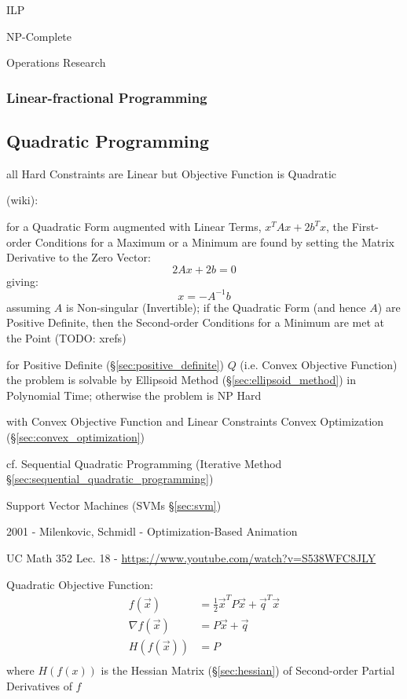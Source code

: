 ILP

NP-Complete

Operations Research



\subsubsection{Linear-fractional Programming}
\label{sec:linear_fractional_programming}



\subsection{Quadratic Programming}\label{sec:quadratic_programming}

all Hard Constraints are Linear but Objective Function is Quadratic

(wiki):

for a Quadratic Form augmented with Linear Terms, $x^TAx + 2b^Tx$, the
First-order Conditions for a Maximum or a Minimum are found by setting the
Matrix Derivative to the Zero Vector:
\[
  2Ax + 2b = 0
\]
giving:
\[
  x = -A^{-1}b
\]
assuming $A$ is Non-singular (Invertible); if the Quadratic Form (and hence
$A$) are Positive Definite, then the Second-order Conditions for a
Minimum are met at the Point
(TODO: xrefs)

for Positive Definite (\S\ref{sec:positive_definite}) $Q$ (i.e. Convex
Objective Function) the problem is solvable by Ellipsoid Method
(\S\ref{sec:ellipsoid_method}) in Polynomial Time; otherwise the problem is NP
Hard

with Convex Objective Function and Linear Constraints \fist Convex Optimization
(\S\ref{sec:convex_optimization})

\fist cf. Sequential Quadratic Programming (Iterative Method
\S\ref{sec:sequential_quadratic_programming})

\fist Support Vector Machines (SVMs \S\ref{sec:svm})

2001 - Milenkovic, Schmidl - Optimization-Based Animation

UC Math 352 Lec. 18 - \url{https://www.youtube.com/watch?v=S538WFC8JLY}

Quadratic Objective Function:
\begin{align*}
  f(\vec{x})        & = \frac{1}{2}\vec{x}^T P \vec{x} + \vec{q}^T\vec{x} \\
  \nabla f(\vec{x}) & = P\vec{x} + \vec{q} \\
  H(f(\vec{x}))     & = P \\
\end{align*}
where $H(f(x))$ is the Hessian Matrix (\S\ref{sec:hessian}) of
Second-order Partial Derivatives of $f$

